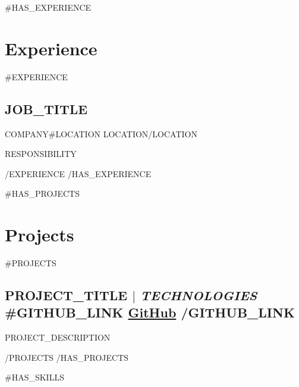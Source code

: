 \documentclass[10pt, a4paper]{article}
\newcommand{\subtext}[1]{
#1\par\vspace{-0.2cm}}
\begin{document}
{{#HAS_EXPERIENCE}}
\section{Experience}
{{#EXPERIENCE}}

\subsection*{{{JOB_TITLE}} \hfill {\normalsize {}}}
\subtext{{{COMPANY}}{{#LOCATION}} \hfill {{LOCATION}}{{/LOCATION}}}
    \begin{itemize}[itemsep=0pt, parsep=1pt, leftmargin=1em]
        {{RESPONSIBILITY}}
    \end{itemize}
    \vspace{-0.3cm}
{{/EXPERIENCE}}
{{/HAS_EXPERIENCE}}

{{#HAS_PROJECTS}}
\section{Projects}
{{#PROJECTS}}

\subsection*{{{PROJECT_TITLE}} $|$ {\normalsize\normalfont \textit{{{TECHNOLOGIES}}}} \hfill {{#GITHUB_LINK}} \href{{{GITHUB_LINK}}}{GitHub} {{/GITHUB_LINK}}}
    \begin{itemize}[itemsep=0pt, parsep=1pt, leftmargin=1em]
        {{PROJECT_DESCRIPTION}}
    \end{itemize}
    \vspace{-0.3cm}
{{/PROJECTS}}
{{/HAS_PROJECTS}}

{{#HAS_SKILLS}}
\end{document}
